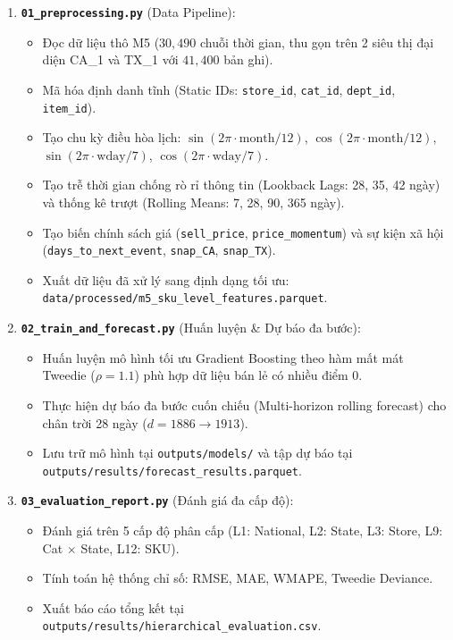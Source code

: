 \documentclass[12pt,a4paper,oneside]{article}
\begin{document}
\begin{enumerate}
    \item \textbf{\texttt{01\_preprocessing.py}} (Data Pipeline):
    \begin{itemize}
        \item Đọc dữ liệu thô M5 ($30{,}490$ chuỗi thời gian, thu gọn trên 2 siêu thị đại diện CA\_1 và TX\_1 với $41{,}400$ bản ghi).
        \item Mã hóa định danh tĩnh (Static IDs: \texttt{store\_id}, \texttt{cat\_id}, \texttt{dept\_id}, \texttt{item\_id}).
        \item Tạo chu kỳ điều hòa lịch: $\sin(2\pi \cdot \text{month}/12)$, $\cos(2\pi \cdot \text{month}/12)$, $\sin(2\pi \cdot \text{wday}/7)$, $\cos(2\pi \cdot \text{wday}/7)$.
        \item Tạo trễ thời gian chống rò rỉ thông tin (Lookback Lags: 28, 35, 42 ngày) và thống kê trượt (Rolling Means: 7, 28, 90, 365 ngày).
        \item Tạo biến chính sách giá (\texttt{sell\_price}, \texttt{price\_momentum}) và sự kiện xã hội (\texttt{days\_to\_next\_event}, \texttt{snap\_CA}, \texttt{snap\_TX}).
        \item Xuất dữ liệu đã xử lý sang định dạng tối ưu: \texttt{data/processed/m5\_sku\_level\_features.parquet}.
    \end{itemize}

    \item \textbf{\texttt{02\_train\_and\_forecast.py}} (Huấn luyện \& Dự báo đa bước):
    \begin{itemize}
        \item Huấn luyện mô hình tối ưu Gradient Boosting theo hàm mất mát Tweedie ($\rho = 1.1$) phù hợp dữ liệu bán lẻ có nhiều điểm 0.
        \item Thực hiện dự báo đa bước cuốn chiếu (Multi-horizon rolling forecast) cho chân trời 28 ngày ($d = 1886 \rightarrow 1913$).
        \item Lưu trữ mô hình tại \texttt{outputs/models/} và tập dự báo tại \texttt{outputs/results/forecast\_results.parquet}.
    \end{itemize}

    \item \textbf{\texttt{03\_evaluation\_report.py}} (Đánh giá đa cấp độ):
    \begin{itemize}
        \item Đánh giá trên 5 cấp độ phân cấp (L1: National, L2: State, L3: Store, L9: Cat $\times$ State, L12: SKU).
        \item Tính toán hệ thống chỉ số: RMSE, MAE, WMAPE, Tweedie Deviance.
        \item Xuất báo cáo tổng kết tại \texttt{outputs/results/hierarchical\_evaluation.csv}.
    \end{itemize}


\end{enumerate}
\end{document}
